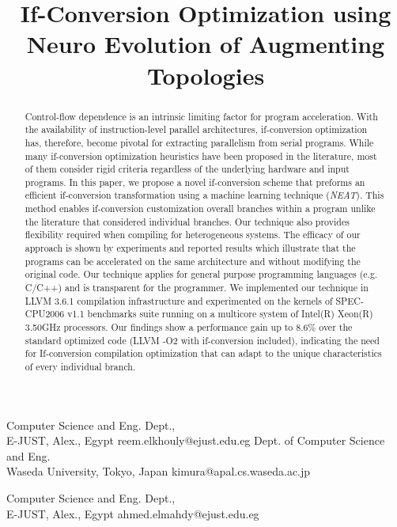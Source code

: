 \documentclass[preprint,nocopyrightspace]{sigplanconf}
\begin{document}
\setlength{\pdfpageheight}{\paperheight}
\setlength{\pdfpagewidth}{\paperwidth}






\title{ If-Conversion Optimization using Neuro Evolution of Augmenting Topologies }

           {Computer Science and Eng. Dept.,\\E-JUST, Alex., Egypt}
           {reem.elkhouly@ejust.edu.eg}
           {Dept. of Computer Science and Eng. \\Waseda University, Tokyo, Japan}
           {kimura@apal.cs.waseda.ac.jp}           
           
           {Computer Science and Eng. Dept.,\\E-JUST, Alex., Egypt}
           {ahmed.elmahdy@ejust.edu.eg}


\maketitle


\begin{abstract}
Control-flow dependence is an intrinsic limiting factor for program acceleration. With the availability of instruction-level parallel architectures, if-conversion optimization has, therefore, become pivotal for extracting parallelism from serial programs. While many if-conversion optimization heuristics have been proposed in the literature, most of them consider rigid criteria regardless of the underlying hardware and input programs.
In this paper, 
we propose a novel if-conversion scheme that preforms an efficient if-conversion transformation using a machine learning technique (\emph{NEAT}). This method enables if-conversion customization overall branches within a program unlike the literature that considered individual branches. Our technique also provides flexibility required when compiling for heterogeneous systems.
The efficacy of our approach is shown by experiments and reported results which illustrate that the programs can be accelerated on the same architecture and without modifying the original code. Our technique applies for general purpose programming languages (e.g. C/C++) and is transparent for the programmer.
We implemented our technique in LLVM 3.6.1 compilation infrastructure and experimented on the kernels of SPEC-CPU2006 v1.1 benchmarks suite running on a multicore system of Intel(R) Xeon(R) 3.50GHz processors.
Our findings show a performance gain up to 8.6\%  over the standard optimized code (LLVM -O2 with if-conversion included), indicating the need for If-conversion compilation optimization that can adapt to the unique characteristics of every individual branch. 

\end{abstract}
\end{document}
